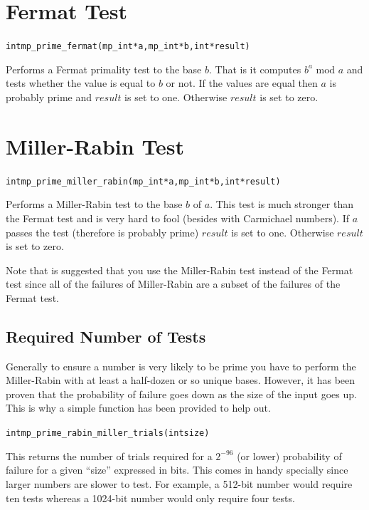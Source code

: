 \documentclass[synpaper]{book}
\begin{document}
\section{Fermat Test}
\begin{alltt}
int mp_prime_fermat (mp_int * a, mp_int * b, int *result)
\end{alltt}
Performs a Fermat primality test to the base $b$.  That is it computes $b^a \mbox{ mod }a$ and tests whether the value is
equal to $b$ or not.  If the values are equal then $a$ is probably prime and $result$ is set to one.  Otherwise $result$
is set to zero.

\section{Miller-Rabin Test}
\begin{alltt}
int mp_prime_miller_rabin (mp_int * a, mp_int * b, int *result)
\end{alltt}
Performs a Miller-Rabin test to the base $b$ of $a$.  This test is much stronger than the Fermat test and is very hard to
fool (besides with Carmichael numbers).  If $a$ passes the test (therefore is probably prime) $result$ is set to one.  
Otherwise $result$ is set to zero.  

Note that is suggested that you use the Miller-Rabin test instead of the Fermat test since all of the failures of 
Miller-Rabin are a subset of the failures of the Fermat test.

\subsection{Required Number of Tests}
Generally to ensure a number is very likely to be prime you have to perform the Miller-Rabin with at least a half-dozen
or so unique bases.  However, it has been proven that the probability of failure goes down as the size of the input goes up.
This is why a simple function has been provided to help out.

\begin{alltt}
int mp_prime_rabin_miller_trials(int size)
\end{alltt}
This returns the number of trials required for a $2^{-96}$ (or lower) probability of failure for a given ``size'' expressed
in bits.  This comes in handy specially since larger numbers are slower to test.  For example, a 512-bit number would
require ten tests whereas a 1024-bit number would only require four tests. 
\end{document}
